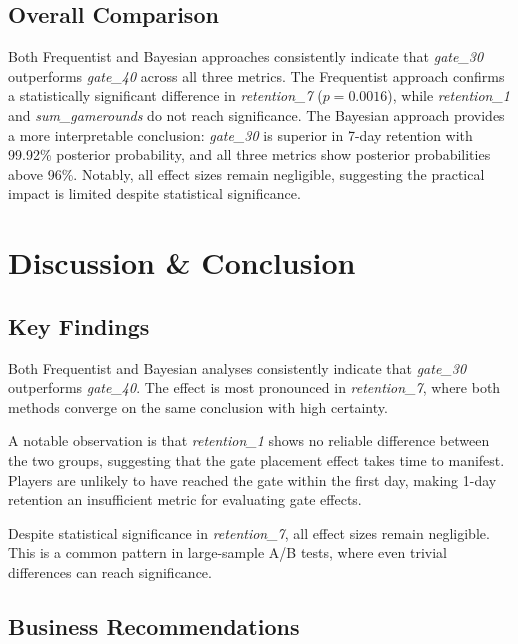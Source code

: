 \documentclass[12pt]{article}
\begin{document}
\subsection{Overall Comparison}

Both Frequentist and Bayesian approaches consistently indicate that \textit{gate\_30} 
outperforms \textit{gate\_40} across all three metrics. The Frequentist approach 
confirms a statistically significant difference in \textit{retention\_7} ($p = 0.0016$), 
while \textit{retention\_1} and \textit{sum\_gamerounds} do not reach significance. 
The Bayesian approach provides a more interpretable conclusion: \textit{gate\_30} is 
superior in 7-day retention with 99.92\% posterior probability, and all three metrics 
show posterior probabilities above 96\%. Notably, all effect sizes remain negligible, 
suggesting the practical impact is limited despite statistical significance.


\section{Discussion \& Conclusion}

\subsection{Key Findings}

Both Frequentist and Bayesian analyses consistently indicate that \textit{gate\_30} 
outperforms \textit{gate\_40}. The effect is most pronounced in \textit{retention\_7}, 
where both methods converge on the same conclusion with high certainty.

A notable observation is that \textit{retention\_1} shows no reliable difference 
between the two groups, suggesting that the gate placement effect takes time to 
manifest. Players are unlikely to have reached the gate within the first day, 
making 1-day retention an insufficient metric for evaluating gate effects.

Despite statistical significance in \textit{retention\_7}, all effect sizes remain 
negligible. This is a common pattern in large-sample A/B tests, where even trivial 
differences can reach significance.

\subsection{Business Recommendations}
\end{document}
